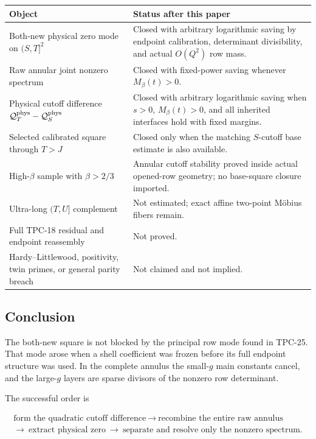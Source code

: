 \begin{center}
\begin{tabular}{>{\raggedright\arraybackslash}p{}
                >{\raggedright\arraybackslash}p{}}
\toprule
Object & Status after this paper\\
\midrule
Both-new physical zero mode on \((S,T]^2\)
& Closed with arbitrary logarithmic saving by endpoint calibration,
  determinant divisibility, and actual \(O(Q^2)\) row mass.\\
\addlinespace
Raw annular joint nonzero spectrum
& Closed with fixed-power saving whenever \(M_\beta(t)>0\).\\
\addlinespace
Physical cutoff difference
\(\mathcal Q_T^{\rm phys}-\mathcal Q_S^{\rm phys}\)
& Closed with arbitrary logarithmic saving when \(s>0\),
  \(M_\beta(t)>0\), and all inherited interfaces hold with fixed
  margins.\\
\addlinespace
Selected calibrated square through \(T>J\)
& Closed only when the matching \(S\)-cutoff base estimate is also
  available.\\
\addlinespace
High-\(\beta\) sample with \(\beta>2/3\)
& Annular cutoff stability proved inside actual opened-row geometry;
  no base-square closure imported.\\
\addlinespace
Ultra-long \((T,U]\) complement
& Not estimated; exact affine two-point M\"obius fibers remain.\\
\addlinespace
Full TPC-18 residual and endpoint reassembly
& Not proved.\\
\addlinespace
Hardy--Littlewood, positivity, twin primes, or general parity breach
& Not claimed and not implied.\\
\bottomrule
\end{tabular}
\end{center}

\subsection{Conclusion}

The both-new square is not blocked by the principal row mode found in
TPC-25.  That mode arose when a shell coefficient was frozen before
its full endpoint structure was used.  In the complete annulus the
small-\(g\) main constants cancel, and the large-\(g\) layers are sparse
divisors of the nonzero row determinant.

The successful order is

\begin{equation}
 \boxed{
 \begin{gathered}
 \text{form the quadratic cutoff difference}
 \ \longrightarrow\
 \text{recombine the entire raw annulus}\\
 \longrightarrow\
 \text{extract physical zero}
 \ \longrightarrow\
 \text{separate and resolve only the nonzero spectrum}.
 \end{gathered}}
 \label{eq:tpc26-order}
\end{equation}

